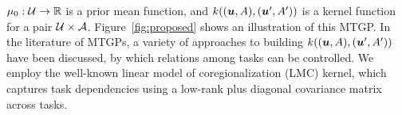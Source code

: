 $\mu_0: {\mathcal U} \rightarrow \mathbb{R}$ 
is a prior mean function, and 
$k((\boldsymbol{u},A), (\boldsymbol{u}^\prime, A^\prime))$
is a kernel function for a pair
${\mathcal U} \times {\mathcal A}$.
%
Figure~\ref{fig:proposed} shows an illustration of this MTGP.
%
In the literature of MTGPs, a variety of approaches to building
$k((\boldsymbol{u}, A), (\boldsymbol{u}^\prime, A^\prime))$
have been discussed, by which relations among tasks can be controlled.
%
We employ the well-known linear model of coregionalization (LMC) \cite{alvarez2012kernels} kernel, which captures task dependencies using a low-rank plus diagonal covariance matrix across tasks.



